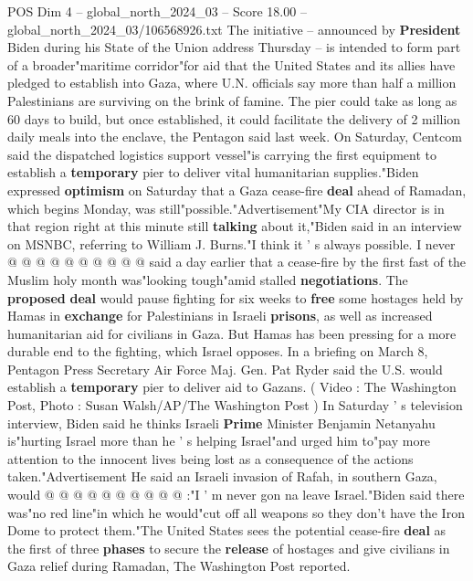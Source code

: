 \begin{textsample}{POS Dim 4 – global\_north\_2024\_03 – Score 18.00 – global\_north\_2024\_03/106568926.txt}  \label{ex:f4_pos_248}
The initiative -- announced by \textbf{President} Biden during his State of the Union address Thursday -- is intended to form part of a broader"maritime corridor"for aid that the United States and its allies have pledged to establish into Gaza, where U.N. officials say more than half a million Palestinians are surviving on the brink of famine.
The pier could take as long as 60 days to build, but once established, it could facilitate the delivery of 2 million daily meals into the enclave, the Pentagon said last week.
On Saturday, Centcom said the dispatched logistics support vessel"is carrying the first equipment to establish a \textbf{temporary} pier to deliver vital humanitarian supplies."Biden expressed \textbf{optimism} on Saturday that a Gaza cease-fire \textbf{deal} ahead of Ramadan, which begins Monday, was still"possible."Advertisement"My CIA director is in that region right at this minute still \textbf{talking} about it,"Biden said in an interview on MSNBC, referring to William J.
Burns."I think it ' s always possible.
I never @ @ @ @ @ @ @ @ @ @ said a day earlier that a cease-fire by the first fast of the Muslim holy month was"looking tough"amid stalled \textbf{negotiations}.
The \textbf{proposed} \textbf{deal} would pause fighting for six weeks to \textbf{free} some hostages held by Hamas in \textbf{exchange} for Palestinians in Israeli \textbf{prisons}, as well as increased humanitarian aid for civilians in Gaza.
But Hamas has been pressing for a more durable end to the fighting, which Israel opposes.
In a briefing on March 8, Pentagon Press Secretary Air Force Maj.
Gen.
Pat Ryder said the U.S. would establish a \textbf{temporary} pier to deliver aid to Gazans. ( Video : The Washington Post, Photo : Susan Walsh/AP/The Washington Post ) In Saturday ' s television interview, Biden said he thinks Israeli \textbf{Prime} Minister Benjamin Netanyahu is"hurting Israel more than he ' s helping Israel"and urged him to"pay more attention to the innocent lives being lost as a consequence of the actions taken."Advertisement He said an Israeli invasion of Rafah, in southern Gaza, would @ @ @ @ @ @ @ @ @ @ :"I ' m never gon na leave Israel."Biden said there was"no red line"in which he would"cut off all weapons so they don't have the Iron Dome to protect them."The United States sees the potential cease-fire \textbf{deal} as the first of three \textbf{phases} to secure the \textbf{release} of hostages and give civilians in Gaza relief during Ramadan, The Washington Post reported.

\end{textsample}
